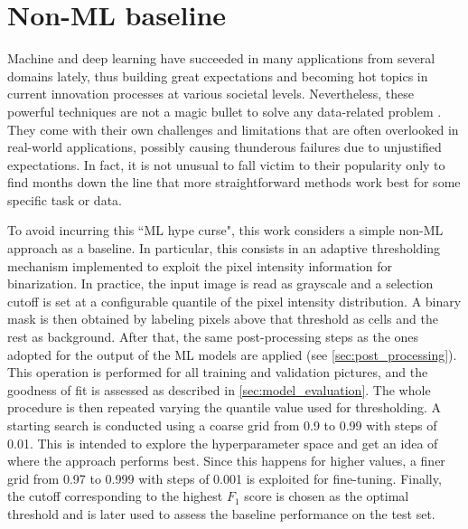 \section{Non-ML baseline}
\label{baseline}

Machine and deep learning have succeeded in many applications from several domains lately, thus building great expectations and becoming hot topics in current innovation processes at various societal levels.
Nevertheless, these powerful techniques are not a magic bullet to solve any data-related problem \cite{wolpert1997nofreelunch}. They come with their own challenges and limitations that are often overlooked in real-world applications, possibly causing thunderous failures due to unjustified expectations.
In fact, it is not unusual to fall victim to their popularity only to find months down the line that more straightforward methods work best for some specific task or data.

To avoid incurring this ``ML hype curse", this work considers a simple \mbox{non-ML} approach as a baseline. 
In particular, this consists in an adaptive thresholding mechanism implemented to exploit the pixel intensity information for binarization.
In practice, the input image is read as grayscale and a selection cutoff is set at a configurable quantile of the pixel intensity distribution.
A binary mask is then obtained by labeling pixels above that threshold as cells and the rest as background.
After that, the same post-processing steps as the ones adopted for the output of the ML models are applied (see \cref{sec:post_processing}).
This operation is performed for all training and validation pictures, and the goodness of fit is assessed as described in \cref{sec:model_evaluation}.
The whole procedure is then repeated varying the quantile value used for thresholding. A starting search is conducted using a coarse grid from 0.9 to 0.99 with steps of 0.01. This is intended to explore the hyperparameter space and get an idea of where the approach performs best. 
Since this happens for higher values, a finer grid from 0.97 to 0.999 with steps of 0.001 is exploited for fine-tuning.
Finally, the cutoff corresponding to the highest $F_1$ score is chosen as the optimal threshold and is later used to assess the baseline performance on the test set.